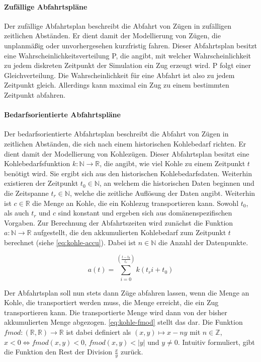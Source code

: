 \paragraph*{Zufällige Abfahrtspläne}

Der zufällige Abfahrtsplan beschreibt die Abfahrt von Zügen in zufälligen zeitlichen Abständen. Er dient damit der Modellierung von Zügen, die unplanmäßig oder unvorhergesehen kurzfristig fahren. Dieser Abfahrtsplan besitzt eine Wahrscheinlichkeitsverteilung P, die angibt, mit welcher Wahrscheinlichkeit zu jedem diskreten Zeitpunkt der Simulation ein Zug erzeugt wird. P folgt einer Gleichverteilung. Die Wahrscheinlichkeit für eine Abfahrt ist also zu jedem Zeitpunkt gleich. Allerdings kann maximal ein Zug zu einem bestimmten Zeitpunkt abfahren.

\paragraph*{Bedarfsorientierte Abfahrtspläne}

Der bedarfsorientierte Abfahrtsplan beschreibt die Abfahrt von Zügen in zeitlichen Abständen, die sich nach einem historischen Kohlebedarf richten. Er dient damit der Modellierung von Kohlezügen. Dieser Abfahrtsplan besitzt eine Kohlebedarfsfunktion $k:\mathbb{N}\to\mathbb{R}$, die angibt, wie viel Kohle zu einem Zeitpunkt $t$ benötigt wird. Sie ergibt sich aus den historischen Kohlebedarfsdaten. Weiterhin existieren der Zeitpunkt $t_0 \in \mathbb{N}$, an welchem die historischen Daten beginnen und die Zeitspanne $t_r \in \mathbb{N}$, welche die zeitliche Auflösung der Daten angibt. Weiterhin ist $c\in\mathbb{R}$ die Menge an Kohle, die ein Kohlezug transportieren kann.  Sowohl $t_0$, als auch $t_r$ und $c$ sind konstant und ergeben sich aus domänenspezifischen Vorgaben. Zur Berechnung der Abfahrtszeiten wird zunächst die Funktion $a: \mathbb{N} \to \mathbb{R}$ aufgestellt, die den akkumulierten Kohlebedarf zum Zeitpunkt $t$ berechnet (siehe \autoref{eq:kohle-accu}). Dabei ist $n\in\mathbb{N}$ die Anzahl der Datenpunkte.

\begin{equation}
    a(t)=\sum_{i=0}^{\left(\frac{t-t_0}{t_r}\right)} k(t_ri+t_0)\label{eq:kohle-accu}
\end{equation}

Der Abfahrtsplan soll nun stets dann Züge abfahren lassen, wenn die Menge an Kohle, die transportiert werden muss, die Menge erreicht, die ein Zug transportieren kann. Die transportierte Menge wird dann von der bisher akkumulierten Menge abgezogen. \autoref{eq:kohle-fmod} stellt das dar. Die Funktion $fmod:(\mathbb{R},\mathbb{R}) \to \mathbb{R}$ ist dabei definiert als $(x,y)\mapsto x-ny$ mit $n\in\mathbb{Z}$, $x<0\Leftrightarrow fmod(x,y)<0$, $fmod(x,y)<|y|$ und $y\neq 0$. Intuitiv formuliert, gibt die Funktion den Rest der Division $\frac{x}{y}$ zurück.

